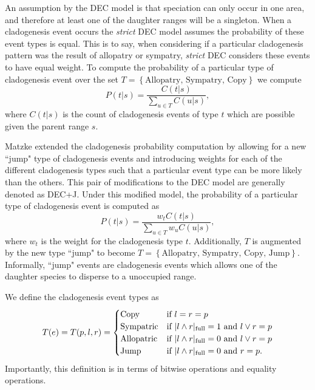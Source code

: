 \documentclass{article}
\begin{document}
An assumption by the DEC model is that speciation can only occur in one area,
and therefore at least one of the daughter ranges will be a singleton.
When a cladogenesis event occurs the \textit{strict} DEC model assumes the
probability of these event types is equal.
This is to say, when considering if a particular cladogenesis pattern was the
result of allopatry or sympatry, \textit{strict} DEC considers these events to
have equal weight.
To compute the probability of a particular type of cladogenesis event over the
set \(T = \left\{\text{Allopatry, Sympatry, Copy}\right\}\) we compute
\[
	P(t |
	s) = \frac{C(t | s)}{\sum_{u \in T} C(u | s)},
\]
where \( C(t|s) \) is the
count of cladogenesis events of type $ t $ which are possible given the parent
range \( s \).

Matzke\cite{ModelSelectionMatzke2014} extended the cladogenesis probability
computation by allowing for a new ``jump" type of cladogenesis events and
introducing weights for each of the different cladogenesis types such that a
particular event type can be more likely than the others.
This pair of modifications to the DEC model are generally denoted as DEC+J.
Under this modified model, the probability of a particular type of cladogenesis
event is computed as
\begin{equation}
	P(t | s) = \frac{w_t C(t | s)}{\sum_{u \in T} w_u C(u |
		s)},
\end{equation}
where $w_t$ is the weight for the cladogenesis type $t$.
Additionally, $T$ is augmented by the new type ``jump" to become \(T =
\left\{\text{Allopatry, Sympatry, Copy, Jump}\right\} \).
Informally, ``jump" events are cladogenesis events which allows one of the
daughter species to disperse to a unoccupied range.

We define the cladogenesis event types as
\begin{equation}
T(e) = T(p, l, r) = 
\begin{cases}
  \text{Copy} & \text{if }l = r = p \\ 
  \text{Sympatric} & \text{if } |l \land r|_\text{full} = 1 \text{ and } l \lor r = p \\ 
  \text{Allopatric} & \text{if } |l \land r|_\text{full} = 0 \text{ and } l \lor r = p   \\ 
  \text{Jump} & \text{if } |l \land r|_\text{full} = 0 \text{ and } r = p. \\ 
\end{cases}
\label{eq:clad-test}
\end{equation}
Importantly, this definition is in terms of bitwise operations and equality
operations.
\end{document}
